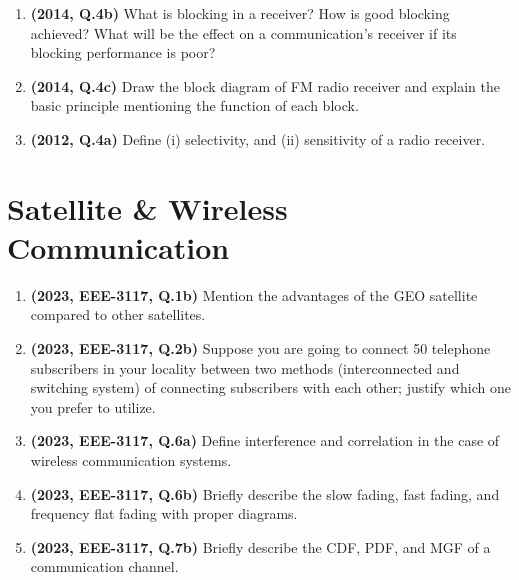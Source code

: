 \documentclass[12pt, a4paper]{article}
\begin{document}
\begin{enumerate}
		\item \textbf{(2014, Q.4b)} What is blocking in a receiver? How is good blocking achieved? What will be the effect on a communication's receiver if its blocking performance is poor?
		
		\item \textbf{(2014, Q.4c)} Draw the block diagram of FM radio receiver and explain the basic principle mentioning the function of each block.
		
		\item \textbf{(2012, Q.4a)} Define (i) selectivity, and (ii) sensitivity of a radio receiver.
		
	\end{enumerate}
	
	\section{Satellite \& Wireless Communication}
	\begin{enumerate}
		\item \textbf{(2023, EEE-3117, Q.1b)} Mention the advantages of the GEO satellite compared to other satellites.
		\item \textbf{(2023, EEE-3117, Q.2b)} Suppose you are going to connect 50 telephone subscribers in your locality between two methods (interconnected and switching system) of connecting subscribers with each other; justify which one you prefer to utilize.
		\item \textbf{(2023, EEE-3117, Q.6a)} Define interference and correlation in the case of wireless communication systems.
		\item \textbf{(2023, EEE-3117, Q.6b)} Briefly describe the slow fading, fast fading, and frequency flat fading with proper diagrams.
		\item \textbf{(2023, EEE-3117, Q.7b)} Briefly describe the CDF, PDF, and MGF of a communication channel.
	\end{enumerate}
	
\end{document}

